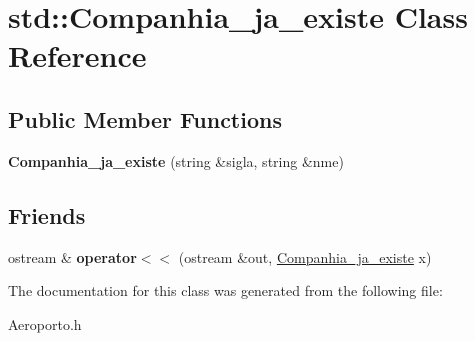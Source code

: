 \hypertarget{classstd_1_1_companhia__ja__existe}{
\section{std::Companhia\_\-ja\_\-existe Class Reference}
\label{classstd_1_1_companhia__ja__existe}
}
\subsection*{Public Member Functions}
\begin{DoxyCompactItemize}
\item 
\hypertarget{classstd_1_1_companhia__ja__existe_a265dcf40e0f38a8596a778719b9bd050}{
{\bfseries Companhia\_\-ja\_\-existe} (string \&sigla, string \&nme)}
\label{classstd_1_1_companhia__ja__existe_a265dcf40e0f38a8596a778719b9bd050}

\end{DoxyCompactItemize}
\subsection*{Friends}
\begin{DoxyCompactItemize}
\item 
\hypertarget{classstd_1_1_companhia__ja__existe_a302470c2652f2550252c15e6a76b84cf}{
ostream \& {\bfseries operator$<$$<$} (ostream \&out, \hyperlink{classstd_1_1_companhia__ja__existe}{Companhia\_\-ja\_\-existe} x)}
\label{classstd_1_1_companhia__ja__existe_a302470c2652f2550252c15e6a76b84cf}

\end{DoxyCompactItemize}


The documentation for this class was generated from the following file:\begin{DoxyCompactItemize}
\item 
Aeroporto.h\end{DoxyCompactItemize}
